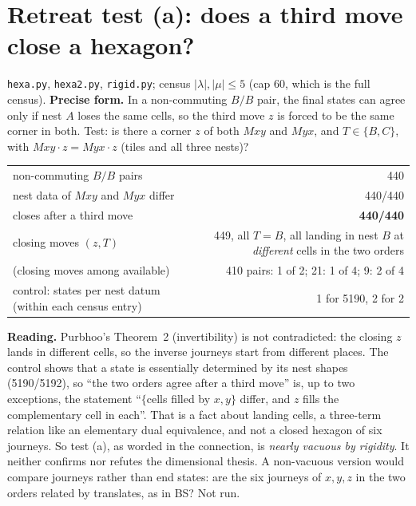 \documentclass[11pt]{article}
\theoremstyle{definition}\newtheorem{definition}[theorem]{Definition}\newtheorem{remark}[theorem]{Remark}
\begin{document}
\section{Retreat test (a): does a third move close a hexagon?}\label{sec:hexa}
\texttt{hexa.py}, \texttt{hexa2.py}, \texttt{rigid.py}; census $|\lambda|,|\mu|\le5$ (cap 60, which is the full census).
\textbf{Precise form.} In a non-commuting $B/B$ pair, the final states can agree only if nest $A$ loses the same cells, so the third move $z$ is forced to be the same corner in both. Test: is there a corner $z$ of both $Mxy$ and $Myx$, and $T\in\{B,C\}$, with $Mxy\cdot z=Myx\cdot z$ (tiles and all three nests)?
\begin{center}\begin{tabular}{lr}\toprule
non-commuting $B/B$ pairs & 440\\
nest data of $Mxy$ and $Myx$ differ & 440/440\\
closes after a third move & \textbf{440/440}\\
closing moves $(z,T)$ & 449, all $T=B$, all landing in nest $B$ at \emph{different} cells in the two orders\\
(closing moves among available) & 410 pairs: 1 of 2; 21: 1 of 4; 9: 2 of 4\\
\midrule
control: states per nest datum (within each census entry) & 1 for 5190, 2 for 2\\\bottomrule
\end{tabular}\end{center}
\textbf{Reading.} Purbhoo's Theorem~2 (invertibility) is not contradicted: the closing $z$ lands in different cells, so the inverse journeys start from different places.
The control shows that a state is essentially determined by its nest shapes (5190/5192), so ``the two orders agree after a third move'' is, up to two exceptions, the statement
``$\{$cells filled by $x,y\}$ differ, and $z$ fills the complementary cell in each''. That is a fact about landing cells, a three-term relation like an elementary dual equivalence, and not a closed hexagon of six journeys.
So test (a), as worded in the connection, is \emph{nearly vacuous by rigidity}. It neither confirms nor refutes the dimensional thesis.
A non-vacuous version would compare journeys rather than end states: are the six journeys of $x,y,z$ in the two orders related by translates, as in BS? Not run.
\end{document}
